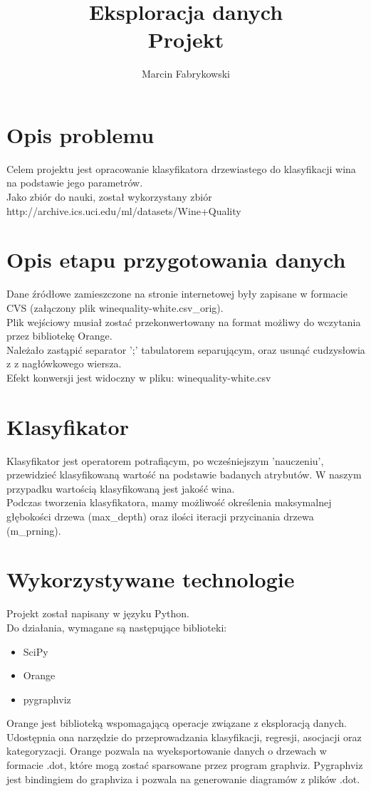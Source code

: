 \documentclass[a4paper,12pt]{article}
\author{Marcin Fabrykowski}
\title{Eksploracja danych\\Projekt}
\begin{document}
\maketitle
\newpage
\tableofcontents
\newpage
\section{Opis problemu}
Celem projektu jest opracowanie klasyfikatora drzewiastego do klasyfikacji wina na podstawie jego parametrów.\\
Jako zbiór do nauki, został wykorzystany zbiór\\
http://archive.ics.uci.edu/ml/datasets/Wine+Quality
\section{Opis etapu przygotowania danych}
Dane źródłowe zamieszczone na stronie internetowej były zapisane w formacie CVS (załączony plik winequality-white.csv\_orig).\\
Plik wejściowy musiał zostać przekonwertowany na format możliwy do wczytania przez bibliotekę Orange.\\
Należało zastąpić separator ';' tabulatorem separującym, oraz usunąć cudzysłowia z z nagłówkowego wiersza.\\
Efekt konwersji jest widoczny w pliku: winequality-white.csv
\section{Klasyfikator}
Klasyfikator jest operatorem potrafiącym, po wcześniejszym 'nauczeniu', przewidzieć klasyfikowaną wartość na podstawie badanych atrybutów. W naszym przypadku wartością klasyfikowaną jest jakość wina.\\
Podczas tworzenia klasyfikatora, mamy możliwość określenia maksymalnej głębokości drzewa (max\_depth) oraz ilości iteracji przycinania drzewa (m\_prning).
\section{Wykorzystywane technologie}
Projekt został napisany w języku Python.\\
Do działania, wymagane są następujące biblioteki:
\begin{itemize}
\item SciPy
\item Orange
\item pygraphviz
\end{itemize}
Orange jest biblioteką wspomagającą operacje związane z eksploracją danych. Udostępnia ona narzędzie do przeprowadzania klasyfikacji, regresji, asocjacji oraz kategoryzacji. Orange pozwala na wyeksportowanie danych o drzewach w formacie .dot, które mogą zostać sparsowane przez program graphviz.
Pygraphviz jest bindingiem do graphviza i pozwala na generowanie diagramów z plików .dot.
\end{document}
